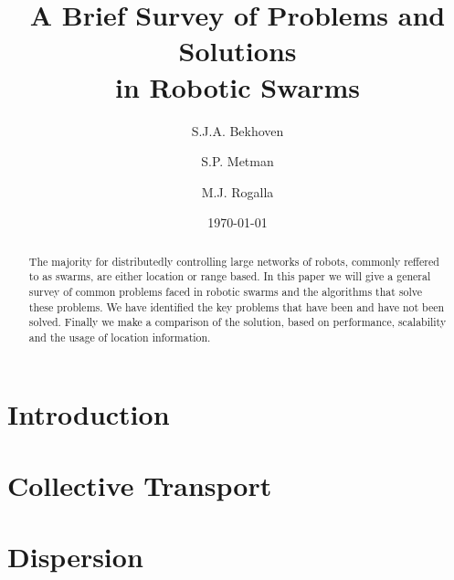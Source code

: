 \documentclass[a4paper]{article}
\title{A Brief Survey of Problems and Solutions \\ in Robotic Swarms}
\author{S.J.A. Bekhoven  \and
    S.P. Metman \and
    M.J. Rogalla}
\date{\today}
\begin{document}
\maketitle
\thispagestyle{empty}

\begin{abstract}
The majority for distributedly controlling large networks of robots, commonly reffered to as swarms, are either location or range based.
In this paper we will give a general survey of common problems faced in robotic swarms and the algorithms that solve these problems.
We have identified the key problems that have been and have not been solved. Finally we make a comparison of the solution, based on performance, scalability and the usage of location information.
\end{abstract}


\section{Introduction}
  
  \begin{center}
  \def\rb{(0:2.5cm) circle (2.5cm)}
  \def\lb{(90:2.5cm) circle (2.5cm)}
  \def\rf{(180:2.5cm) circle (2.5cm)}
  \def\lf{(270:2.5cm) circle (2.5cm)}
  \end{center}
  

\section{Collective Transport}
\label{sec:CollectiveTransport}
  
  
\section{Dispersion}
  
 
\end{document}
